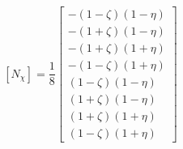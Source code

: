 \documentclass[a4paper,12pt]{article}
\begin{document}
    \[ [N_\chi] = \frac{1}{8} \left[ \begin{array}{c}
               -(1-\zeta)(1-\eta) \\
               -(1+\zeta)(1-\eta) \\
               -(1+\zeta)(1+\eta) \\
               -(1-\zeta)(1+\eta) \\
                (1-\zeta)(1-\eta) \\
                (1+\zeta)(1-\eta) \\
                (1+\zeta)(1+\eta) \\
                (1-\zeta)(1+\eta)
            \end{array}\right]\]
\end{document}

